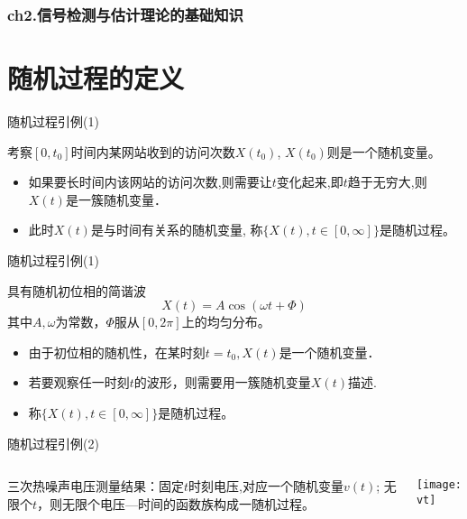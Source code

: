 \begin{frame}[shrink]
\frametitle{ch2.信号检测与估计理论的基础知识}
\tableofcontents[hideallsubsections]
\end{frame}

\section{随机过程的定义}

\begin{frame}{随机过程引例(1)}
\begin{example}
	考察$[0,t_0]$时间内某网站收到的访问次数$X(t_0)$, $X(t_0)$则是一个随机变量。
	\begin{itemize}
		\item 如果要长时间内该网站的访问次数,则需要让$t$变化起来,即$t$趋于无穷大,则$X(t)$是一簇随机变量．
		\item 此时$X(t)$是与时间有关系的随机变量, 称$\{X(t),t\in[0,\infty]\}$是随机过程。
	\end{itemize}	
\end{example}
\end{frame}

\begin{frame}{随机过程引例(1)}
\begin{example}
	具有随机初位相的简谐波
	\[X(t)=A\cos(\omega t+\Phi)\]
	其中$A,\omega$为常数，$\Phi$服从$[0,2\pi]$上的均匀分布。
	\begin{itemize}
		\item 由于初位相的随机性，在某时刻$t=t_0,X(t)$是一个随机变量．
		\item 若要观察任一时刻$t$的波形，则需要用一簇随机变量$X(t)$描述. 
		\item 称$\{X(t),t\in[0,\infty]\}$是随机过程。
	\end{itemize}	
\end{example}
\end{frame}

\begin{frame}{随机过程引例(2)}
\begin{columns}
	\begin{example}
		三次热噪声电压测量结果：固定$t$时刻电压,对应一个随机变量$v(t)$; 无限个$t$，则无限个电压---时间的函数族构成一随机过程。
	\end{example}
	\texttt{[image: vt]}
\end{columns}
\end{frame}

